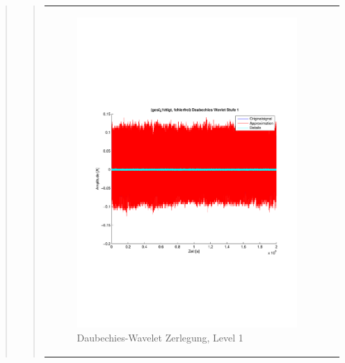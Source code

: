 \begin{quote}
\begin{quote}
\begin{center}
\begin{tabular}{ll}
\begin{minipage}{0.6\textwidth}
                        \begin{figure}[H]
                            \label{fig:}
                            \includegraphics[scale=0.4, trim = 2cm 6cm 1cm
                            7.5cm,
                            clip]{./Bilder/Termin8/fehlerfrei_gesaettigt_Daubechies_Wavlet_lvl_1}
                            \caption{Daubechies-Wavelet Zerlegung, Level 1}
                        \end{figure}
                    \vspace{-1.5em}
    
                    \end{minipage}
    
                \end{tabular}
                \end{center}
                

\end{quote}
\end{quote}
